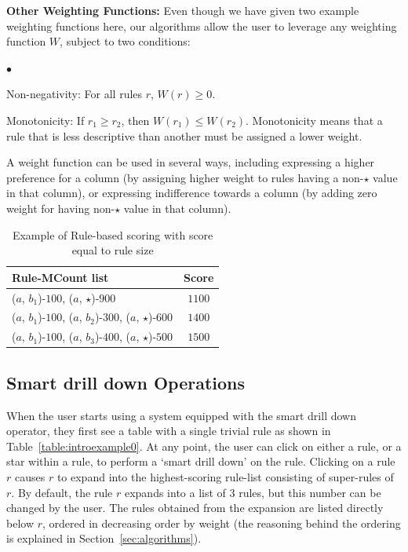 \documentclass[10pt,journal,compsoc]{IEEEtran}
\newcommand{\squishlist}{
   \begin{list}{$\bullet$}
    { \setlength{\itemsep}{0pt}
      \setlength{\parsep}{2pt}
      \setlength{\topsep}{2pt}
      \setlength{\partopsep}{0pt}
    }
}
\newcommand{\stitle}[1]{\vspace{0.5em}\noindent\textbf{#1}}
\newcommand{\squishend}{\end{list}}
\newcommand{\techreporttext}[1]{#1}
\begin{document}
\smallskip

\stitle{Other Weighting Functions:}
Even though we have given two example weighting functions here, our algorithms allow the user to leverage any weighting function $W$, subject to two conditions:
\squishlist
\item Non-negativity: For all rules $r$, $W(r) \geq 0$.
\item Monotonicity: If $r_1 \geq r_2$, then $W(r_1) \leq W(r_2)$. Monotonicity means that a rule that is less descriptive than another must be assigned a lower weight.
\squishend
A weight function can be used in several ways, including expressing a higher preference for a column (by assigning higher weight to rules having a non-$\star$ value in that column), or expressing indifference towards a column (by adding zero weight for having non-$\star$ value in that column).

\techreporttext{
\begin{table}
\centering
\scriptsize
\begin{tabular}{ | l | c | }
 \hline Rule-MCount list & Score \\ \hline
  ($a$, $b_1$)-$100$, ($a$, $\star$)-$900$ & $1100$ \\
  ($a$, $b_1$)-$100$, ($a$, $b_2$)-$300$, ($a$, $\star$)-$600$ & $1400$  \\
  ($a$, $b_1$)-$100$, ($a$, $b_3$)-$400$, ($a$, $\star$)-$500$ & $1500$ \\ \hline
\end{tabular}
\caption{Example of Rule-based scoring with score equal to rule size \label{table:sizescoringexample}}
\end{table}
}

\subsection{Smart drill down Operations}
\label{sec:interface}
When the user starts using a system equipped with
the smart drill down operator, they first see a table with a single trivial rule as shown in Table~\ref{table:introexample0}. At any point, the user can click on either a rule, or a star within a rule, to perform a `smart drill down' on the rule. Clicking on a rule $r$ causes $r$ to expand into the highest-scoring rule-list consisting of super-rules of $r$. By default, the rule $r$ expands into a list of $3$ rules, but this number can be changed by the user.
The rules obtained from the expansion are listed directly below $r$, ordered in decreasing order by weight (the reasoning behind the ordering is explained in Section~\ref{sec:algorithms}).
\end{document}
